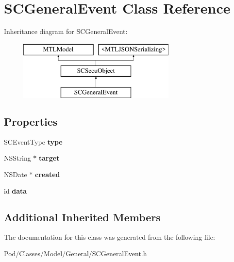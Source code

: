 \hypertarget{interface_s_c_general_event}{}\section{S\+C\+General\+Event Class Reference}
\label{interface_s_c_general_event}
Inheritance diagram for S\+C\+General\+Event\+:\begin{figure}[H]
\begin{center}
\leavevmode
\includegraphics[height=3.000000cm]{interface_s_c_general_event}
\end{center}
\end{figure}
\subsection*{Properties}
\begin{DoxyCompactItemize}
\item 
S\+C\+Event\+Type {\bfseries type}\hypertarget{interface_s_c_general_event_a74becc374ab096bed9f7f3d4b6fd84af}{}\label{interface_s_c_general_event_a74becc374ab096bed9f7f3d4b6fd84af}

\item 
N\+S\+String $\ast$ {\bfseries target}\hypertarget{interface_s_c_general_event_a7c9bd360fa78dcd4ff65341dee8e369c}{}\label{interface_s_c_general_event_a7c9bd360fa78dcd4ff65341dee8e369c}

\item 
N\+S\+Date $\ast$ {\bfseries created}\hypertarget{interface_s_c_general_event_a6b3b2c46cbd824024746568a3c7d76f6}{}\label{interface_s_c_general_event_a6b3b2c46cbd824024746568a3c7d76f6}

\item 
id {\bfseries data}\hypertarget{interface_s_c_general_event_a689cc255cff4724d70cabbd943a551ff}{}\label{interface_s_c_general_event_a689cc255cff4724d70cabbd943a551ff}

\end{DoxyCompactItemize}
\subsection*{Additional Inherited Members}


The documentation for this class was generated from the following file\+:\begin{DoxyCompactItemize}
\item 
Pod/\+Classes/\+Model/\+General/S\+C\+General\+Event.\+h\end{DoxyCompactItemize}
